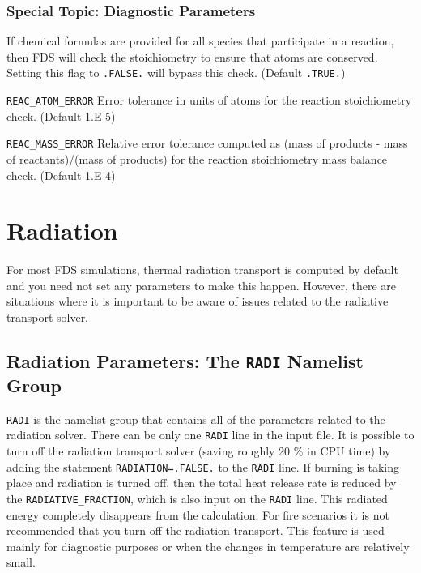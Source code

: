 \documentclass[11pt]{book}
\newcommand{\ct}{\tt\small}
\begin{document}
\subsection{Special Topic: Diagnostic Parameters}
\label{info:REAC_Diagnostics}

\begin{description}
\item[{\ct CHECK\_ATOM\_BALANCE}] If chemical formulas are provided for all species that participate in a reaction, then FDS will
check the stoichiometry to ensure that atoms are conserved.  Setting this flag to {\ct .FALSE.} will bypass this check.  (Default {\ct .TRUE.})
\item{\ct REAC\_ATOM\_ERROR} Error tolerance in units of atoms for the reaction stoichiometry check.  (Default 1.E-5)
\item{\ct REAC\_MASS\_ERROR} Relative error tolerance computed as (mass of products - mass of reactants)/(mass of products)
for the reaction stoichiometry mass balance check.  (Default 1.E-4)
\end{description}





\chapter{Radiation}

For most FDS simulations, thermal radiation transport is computed by default and you need not set any
parameters to make this happen. However, there are situations where it is important to be aware of
issues related to the radiative transport solver.

\section{Radiation Parameters: The \texorpdfstring{{\tt RADI}}{RADI} Namelist Group}
\label{info:RADI}

{\ct RADI} is the namelist group that contains all of the parameters related to the radiation solver. There can be only one
{\ct RADI} line in the input file. It is possible to turn off the radiation transport
solver (saving roughly 20 \% in CPU time) by adding the statement
{\ct RADIATION=.FALSE.} to the {\ct RADI} line.  If burning
is taking place and radiation is turned off, then the total heat
release rate is reduced by the {\ct RADIATIVE\_FRACTION}, which is
also input on the {\ct RADI} line. This radiated energy completely
disappears from the calculation. For fire scenarios it is not recommended that you turn off the
radiation transport. This feature is used mainly for diagnostic purposes or when the changes in
temperature are relatively small.
\end{document}
